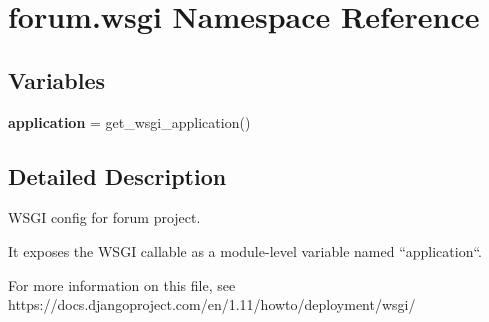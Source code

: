 \hypertarget{namespaceforum_1_1wsgi}{}\section{forum.\+wsgi Namespace Reference}
\label{namespaceforum_1_1wsgi}
\subsection*{Variables}
\begin{DoxyCompactItemize}
\item 
\mbox{\label{namespaceforum_1_1wsgi_a1fafcc7467a8cdafbe711349d564c78e}} 
{\bfseries application} = get\+\_\+wsgi\+\_\+application()
\end{DoxyCompactItemize}


\subsection{Detailed Description}
\begin{DoxyVerb}WSGI config for forum project.

It exposes the WSGI callable as a module-level variable named ``application``.

For more information on this file, see
https://docs.djangoproject.com/en/1.11/howto/deployment/wsgi/
\end{DoxyVerb}
 